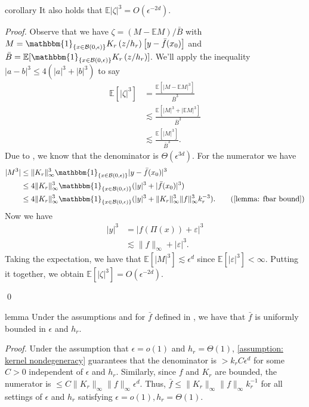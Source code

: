 \documentclass[11pt]{article}
\begin{document}
\begin{restatable}{corollary}{} \label{corr: zeta third moment}
    It also holds that $\mathbb{E}|\zeta|^3  = O(\epsilon^{-2d})$.
\end{restatable}
\noindent \textit{Proof.} Observe that we have $\zeta = (M - \mathbb{E}M)/\bar{B}$ with $M = \mathbbm{1}_{\{x \in \mathcal{B}(0, \epsilon)\}}K_r\left(z/h_r \right)\left[y - \bar{f}(x_0)\right]$ and $\bar{B} = \mathbb{E}[\mathbbm{1}_{\{x \in \mathcal{B}(0, \epsilon)\}}K_r\left(z/h_r \right)]$. We'll apply the inequality $|a - b|^3 \leq 4(|a|^3 + |b|^3)$ to say 
\begin{align*}
    \mathbb{E}\left[|\zeta|^3\right] &= \frac{\mathbb{E}\left[|M - \mathbb{E}M|^3\right]}{\bar{B}^3} \\
    &\lesssim  \frac{\mathbb{E}\left[|M|^3 + |\mathbb{E}M|^3\right]}{\bar{B}^3} \\
    & \lesssim \frac{\mathbb{E}\left[|M|^3\right]}{\bar{B}^3}. \tag{Jensen's Inequality}
\end{align*}
Due to , we know that the denominator is $\Theta(\epsilon^{3d})$. For the numerator we have
\begin{align*}
    |M^3| &\leq \|K_r\|_{\infty}^3\mathbbm{1}_{\{x \in \mathcal{B}(0, \epsilon)\}}|y - \bar{f}(x_0)|^3 \\
    &\leq 4\|K_r\|_{\infty}^3\mathbbm{1}_{\{x \in \mathcal{B}(0, \epsilon)\}}(|y|^3 + |\bar{f}(x_0)|^3) \\
    &\leq 4\|K_r\|_{\infty}^3\mathbbm{1}_{\{x \in \mathcal{B}(0, \epsilon)\}}(|y|^3 + \|K_r\|_{\infty}^3\|f\|_{\infty}^3k_r^{-3}). \tag{\Cref{lemma: fbar bound}}
\end{align*}
Now we have \begin{align*}
    |y|^3 &= |f(\Pi(x)) + \varepsilon|^3 \\
    &\lesssim \|f\|_{\infty} + |\varepsilon|^3.
\end{align*}
Taking the expectation, we have that $\mathbb{E}[|M|^3] \lesssim \epsilon^d$ since $\mathbb{E}[|\varepsilon|^3] < \infty$. Putting it together, we obtain $\mathbb{E}[|\zeta|^3] = O(\epsilon^{-2d})$. 

\qed{}

\begin{restatable}{lemma}{} \label{lemma: fbar bound}
    Under the assumptions  and for $\bar f$ defined in , we have that $\bar f$ is uniformly bounded in $\epsilon$ and $h_r$. 
\end{restatable}
\noindent \textit{Proof.} Under the assumption that $\epsilon = o(1)$ and $ h_r = \Theta(1)$, \cref{assumption: kernel nondegeneracy} guarantees that the denominator is  $> k_rC\epsilon^d$ for some $C > 0$ independent of $\epsilon$ and $h_r$. Similarly, since $f$ and $K_r$ are bounded, the numerator is $\leq C\|K_r\|_{\infty} \|f\|_{\infty} \epsilon^d$. Thus, $\bar{f} \leq \|K_r\|_{\infty} \|f\|_{\infty}k_r^{-1}$ for all settings of $\epsilon$ and $h_r$ satisfying $\epsilon = o(1), h_r = \Theta(1)$. 
\end{document}
